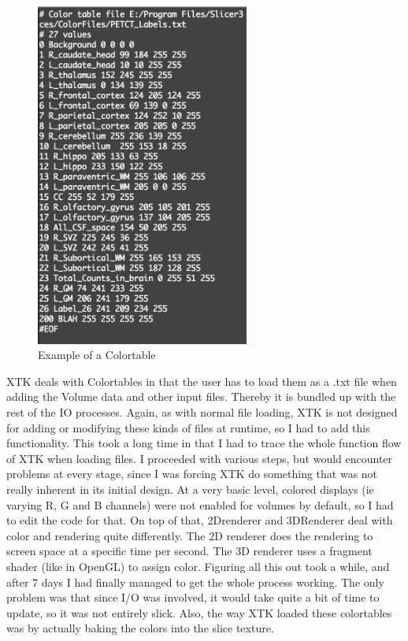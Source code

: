 \documentclass[a4paper,11pt,twoside]{article}
\begin{document}
\begin{figure}[ht!]
\centering
\includegraphics[width=70mm]{graphics/Colortable_01.png}
\caption{Example of a Colortable}
\label{fig:UIdesign1}
\end{figure}

XTK deals with Colortables in that the user has to load them as a .txt file when adding the Volume data and other input files. Thereby it is bundled up with the rest of the IO processes. Again, as with normal file loading, XTK is not designed for adding or modifying these kinds of files at runtime, so I had to add this functionality. This took a long time in that I had to trace the whole function flow of XTK when loading files. I proceeded with various steps, but would encounter problems at every stage, since I was forcing XTK do something that was not really inherent in its initial design. At a very basic level, colored displays (ie varying R, G and B channels) were not enabled for volumes by default, so I had to edit the code for that. On top of that, 2Drenderer and 3DRenderer deal with color and rendering quite differently. The 2D renderer does the rendering to screen space at a specific time per second. The 3D renderer uses a fragment shader (like in OpenGL) to assign color. Figuring all this out took a while, and after 7 days I had finally managed to get the whole process working. The only problem was that since I/O was involved, it would take quite a bit of time to update, so it was not entirely slick. Also, the way XTK loaded these colortables was by actually baking the colors into the slice texture. 
\end{document}
